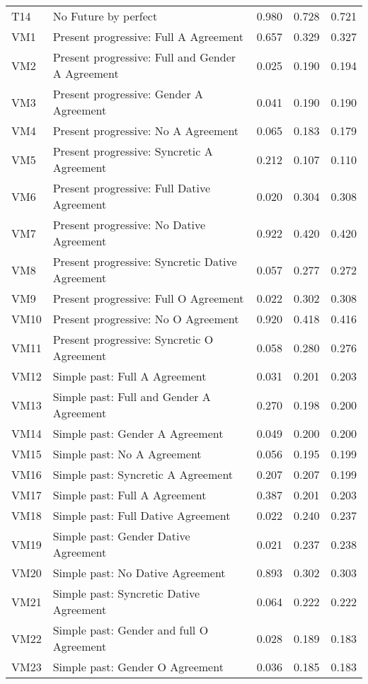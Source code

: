 \begin{longtable}{lllll}
T14 & No Future by perfect & 0.980 & 0.728 & 0.721\\
VM1 & Present progressive: Full A Agreement & 0.657 & 0.329 & 0.327\\
VM2 & Present progressive: Full and Gender A Agreement & 0.025 & 0.190 & 0.194\\
VM3 & Present progressive: Gender A Agreement & 0.041 & 0.190 & 0.190\\
VM4 & Present progressive: No A Agreement & 0.065 & 0.183 & 0.179\\
VM5 & Present progressive: Syncretic A Agreement & 0.212 & 0.107 & 0.110\\
VM6 & Present progressive: Full Dative Agreement & 0.020 & 0.304 & 0.308\\
VM7 & Present progressive: No Dative Agreement & 0.922 & 0.420 & 0.420\\
VM8 & Present progressive: Syncretic Dative Agreement & 0.057 & 0.277 & 0.272\\
VM9 & Present progressive: Full O Agreement & 0.022 & 0.302 & 0.308\\
VM10 & Present progressive: No O Agreement & 0.920 & 0.418 & 0.416\\
VM11 & Present progressive: Syncretic O Agreement & 0.058 & 0.280 & 0.276\\
VM12 & Simple past: Full A Agreement & 0.031 & 0.201 & 0.203\\
VM13 & Simple past: Full and Gender A Agreement & 0.270 & 0.198 & 0.200\\
VM14 & Simple past: Gender A Agreement & 0.049 & 0.200 & 0.200\\
VM15 & Simple past: No A Agreement & 0.056 & 0.195 & 0.199\\
VM16 & Simple past: Syncretic A Agreement & 0.207 & 0.207 & 0.199\\
VM17 & Simple past: Full A Agreement & 0.387 & 0.201 & 0.203\\
VM18 & Simple past: Full Dative Agreement & 0.022 & 0.240 & 0.237\\
VM19 & Simple past: Gender Dative Agreement & 0.021 & 0.237 & 0.238\\
VM20 & Simple past: No Dative Agreement & 0.893 & 0.302 & 0.303\\
VM21 & Simple past: Syncretic Dative Agreement & 0.064 & 0.222 & 0.222\\
VM22 & Simple past: Gender and full O Agreement & 0.028 & 0.189 & 0.183\\
VM23 & Simple past: Gender O Agreement & 0.036 & 0.185 & 0.183\\

\end{longtable}
